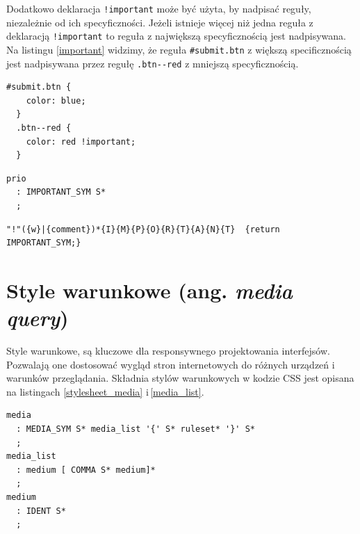 \documentclass[a4paper,12pt]{book} %
\begin{document}
Dodatkowo deklaracja \lstinline|!important| może być użyta, by nadpisać reguły, niezależnie od ich specyficzności. Jeżeli istnieje więcej niż jedna reguła z deklaracją \lstinline|!important| to reguła z największą specyficznością jest nadpisywana. Na listingu \ref{important} widzimy, że reguła \lstinline|#submit.btn| z większą specificznością jest nadpisywana przez regułę \lstinline|.btn--red| z mniejszą specyficznością.


\begin{lstfloat}[hb]
  \lstset{language=HTML}
  \begin{lstlisting}[frame=single]
  #submit.btn {
    color: blue;
  }
  .btn--red {
    color: red !important;
  }
  \end{lstlisting}
  \caption{Przykład użycia deklaracji \lstinline|!important|}\label{important}
\end{lstfloat}

\begin{lstfloat}[hb]
  \lstset{language=HTML}
  \begin{lstlisting}[frame=single]
  prio
  : IMPORTANT_SYM S*
  ;
\end{lstlisting}
  \caption{Składnia priorytetu CSS \cite{GrammarofCSS}}
\end{lstfloat}

\begin{lstfloat}[hb]
  \lstset{language=HTML}
  \begin{lstlisting}[frame=single]
"!"({w}|{comment})*{I}{M}{P}{O}{R}{T}{A}{N}{T}	{return IMPORTANT_SYM;}
\end{lstlisting}
  \caption{Składnia symbolu \lstinline|!important| w CSS \cite{GrammarofCSS}}
\end{lstfloat}

\clearpage
\section{Style warunkowe (ang. \emph{media query})}
Style warunkowe, są kluczowe dla responsywnego projektowania interfejsów. Pozwalają one dostosować wygląd stron internetowych do różnych urządzeń i\,warunków przeglądania. Składnia stylów warunkowych w kodzie CSS jest opisana na listingach \ref{stylesheet_media} i\,\ref{media_list}.


\begin{lstfloat}[hb]
  \lstset{language=HTML}
  \begin{lstlisting}[frame=single]
media
  : MEDIA_SYM S* media_list '{' S* ruleset* '}' S*
  ;
media_list
  : medium [ COMMA S* medium]*
  ;
medium
  : IDENT S*
  ;
\end{lstlisting}
  \caption{Składnia stylów warunkowych \cite{GrammarofCSS}}\label{stylesheet_media}
\end{lstfloat}
\end{document}
